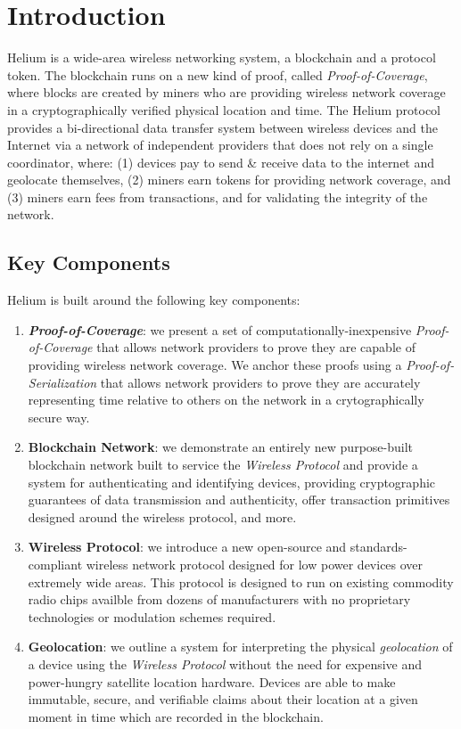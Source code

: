 \documentclass[letterpaper,11pt]{article}
\def\proofofcoverage/{\textit{Proof-of-Coverage}}
\begin{document}
\newpage

\tableofcontents
\newpage

\section{Introduction}

Helium is a wide-area wireless networking system, a blockchain and a protocol token. The blockchain runs on a new kind of proof, called \proofofcoverage/, where blocks are created by miners who are providing wireless network coverage in a cryptographically verified physical location and time. The Helium protocol provides a bi-directional data transfer system between wireless devices and the Internet via a network of independent providers that does not rely on a single coordinator, where: (1) devices pay to send \& receive data to the internet and geolocate themselves, (2) miners earn tokens for providing network coverage, and (3) miners earn fees from transactions, and for validating the integrity of the network.

\subsection{Key Components}

Helium is built around the following key components:

\begin{enumerate}
  \item \textbf{\proofofcoverage/}: we present a set of computationally-inexpensive \proofofcoverage/ that allows network providers to prove they are capable of providing wireless network coverage. We anchor these proofs using a \textit{Proof-of-Serialization} that allows network providers to prove they are accurately representing time relative to others on the network in a crytographically secure way.
  
  \item \textbf{Blockchain Network}: we demonstrate an entirely new purpose-built blockchain network built to service the \textit{Wireless Protocol} and provide a system for authenticating and identifying devices, providing cryptographic guarantees of data transmission and authenticity, offer transaction primitives designed around the wireless protocol, and more.
  
	\item \textbf{Wireless Protocol}: we introduce a new open-source and standards-compliant wireless network protocol designed for low power devices over extremely wide areas. This protocol is designed to run on existing commodity radio chips availble from dozens of manufacturers with no proprietary technologies or modulation schemes required.
	
	\item \textbf{Geolocation}: we outline a system for interpreting the physical \textit{geolocation} of a device using the \textit{Wireless Protocol} without the need for expensive and power-hungry satellite location hardware. Devices are able to make immutable, secure, and verifiable claims about their location at a given moment in time which are recorded in the blockchain.
\end{enumerate}
\end{document}
